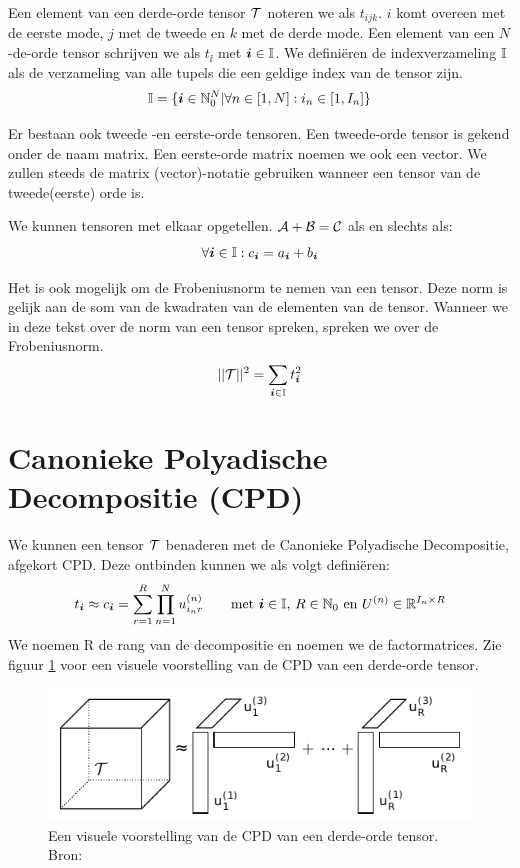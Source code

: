 Een element van een derde-orde tensor $\mathcal{T}$ noteren we als $t_{ijk}$. $i$ komt overeen met de eerste mode, $j$ met de tweede en $k$ met de derde mode. Een element van een $N$-de-orde tensor schrijven we als $t_{\ii{}}$ met $\boldsymbol{i}{} \in \mathbb{I}$. We defini\"eren de indexverzameling $\mathbb{I}$ als de verzameling van alle tupels die een geldige index van de tensor zijn.
\[
    \mathbb{I} = \{\boldsymbol{i}{} \in \mathbb{N}_0^N | \forall n \in [1, N]: i_n \in [1, I_n]\}
\]


Er bestaan ook tweede -en eerste-orde tensoren. Een tweede-orde tensor is gekend onder de naam matrix. Een eerste-orde matrix noemen we ook een vector. We zullen steeds de matrix (vector)-notatie gebruiken wanneer een tensor van de tweede(eerste) orde is.

We kunnen tensoren met elkaar opgetellen. $\mathcal{A} + \mathcal{B} = \mathcal{C}$ als en slechts als:
\[
	\forall \boldsymbol{i}{} \in \mathbb{I}: c_{\boldsymbol{i}{}} = a_{\boldsymbol{i}{}} + b_{\boldsymbol{i}{}}
\]

Het is ook mogelijk om de Frobeniusnorm te nemen van een tensor. Deze norm is gelijk aan de som van de kwadraten van de elementen van de tensor. Wanneer we in deze tekst over de norm van een tensor spreken, spreken we over de Frobeniusnorm.
\[
	||\mathcal{T}||^2 = \sum_{\boldsymbol{i}{} \in \mathbb{I}} t_{\boldsymbol{i}{}}^2
\]

\section{Canonieke Polyadische Decompositie (CPD)}
We kunnen een tensor $\mathcal{T}$ benaderen met de Canonieke Polyadische Decompositie, afgekort CPD. 
Deze ontbinden kunnen we als volgt defini\"eren:
\[
    t_{\boldsymbol{i}{}} \approx c_{\boldsymbol{i}{}} = \sum_{r=1}^{R} \prod_{n=1}^{N} u^{(n)}_{i_{n}r} \qquad
    \text{met $\boldsymbol{i}{} \in \mathbb{I}$, $R \in \mathbb{N}_0$ en $U^{(n)} \in \mathbb{R}^{I_n \times R} $}
\]
We noemen R de rang van de decompositie en \UUU{} noemen we de factormatrices. Zie figuur \ref{cpdTekening} voor een visuele voorstelling van de CPD van een derde-orde tensor.

\begin{figure}
\centering
\includegraphics{cpd}
\caption{\label{cpdTekening}Een visuele voorstelling van de CPD van een derde-orde tensor. Bron: \cite[p.~4]{laurent}}
\end{figure}

